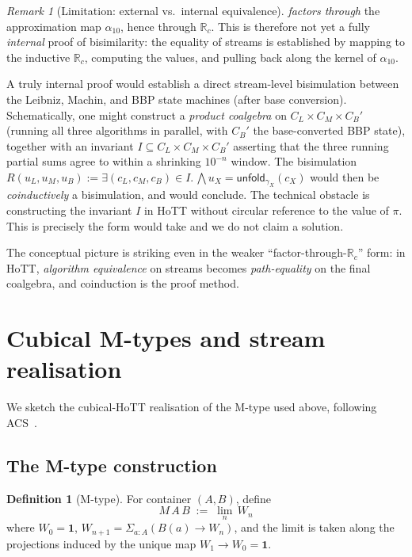 \documentclass[12pt]{article}
\theoremstyle{definition}
\newtheorem{definition}[theorem]{Definition}
\theoremstyle{remark}
\newtheorem{remark}[theorem]{Remark}
\newcommand{\R}{\mathbb{R}}
\newcommand{\Rc}{\R_c}
\newcommand{\unfold}{\mathsf{unfold}}
\begin{document}
\begin{remark}[Limitation: external vs.\ internal equivalence]
 \emph{factors through} the approximation
map $\alpha_{10}$, hence through $\Rc$. This is therefore not
yet a fully \emph{internal} proof of bisimilarity: the
equality of streams is established by mapping to the inductive
$\Rc$, computing the values, and pulling back along the kernel
of $\alpha_{10}$.

A truly internal proof would establish a direct stream-level
bisimulation between the Leibniz, Machin, and BBP state machines
(after base conversion). Schematically, one might construct a
\emph{product coalgebra} on $C_L \times C_M \times C_B'$
(running all three algorithms in parallel, with $C_B'$ the
base-converted BBP state), together with an invariant
$I \subseteq C_L \times C_M \times C_B'$ asserting that the
three running partial sums agree to within a shrinking
$10^{-n}$ window. The bisimulation
$R(u_L, u_M, u_B) := \exists (c_L, c_M, c_B) \in I.\,
\bigwedge u_X = \unfold_{\gamma_X}(c_X)$
would then be \emph{coinductively} a bisimulation, and
 would conclude. The technical obstacle
is constructing the invariant $I$ in HoTT without circular
reference to the value of $\pi$. This is precisely the form
 would take and we do not claim a solution.

The conceptual picture is striking even in the weaker
``factor-through-$\Rc$'' form: in HoTT, \emph{algorithm
equivalence} on streams becomes \emph{path-equality} on the
final coalgebra, and coinduction is the proof method.
\end{remark}

\section{Cubical M-types and stream realisation}\label{sec:cubical}

We sketch the cubical-HoTT realisation of the M-type used
above, following ACS~\cite{ACS}.

\subsection{The M-type construction}

\begin{definition}[M-type]\label{def:Mtype}
For container $(A,B)$, define
\[
M\,A\,B \;:=\; \lim_{n}\,W_n
\]
where $W_0 = \mathbf{1}$, $W_{n+1} = \Sigma_{a:A}(B(a) \to W_n)$,
and the limit is taken along the projections induced by the unique
map $W_1 \to W_0 = \mathbf{1}$.
\end{definition}
\end{document}
